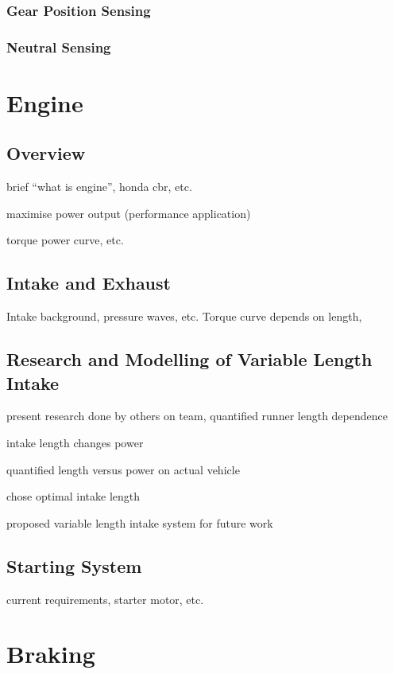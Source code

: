 \subsubsection{Gear Position Sensing}


\subsubsection{Neutral Sensing}


\section{Engine}


\subsection{Overview}

brief {}``what is engine'', honda cbr, etc.

maximise power output (performance application)

torque power curve, etc.


\subsection{Intake and Exhaust}

Intake background, pressure waves, etc. Torque curve depends on length, 


\subsection{Research and Modelling of Variable Length Intake}

present research done by others on team, quantified runner length
dependence

intake length changes power

quantified length versus power on actual vehicle

chose optimal intake length

proposed variable length intake system for future work


\subsection{Starting System}

current requirements, starter motor, etc.


\section{Braking}


